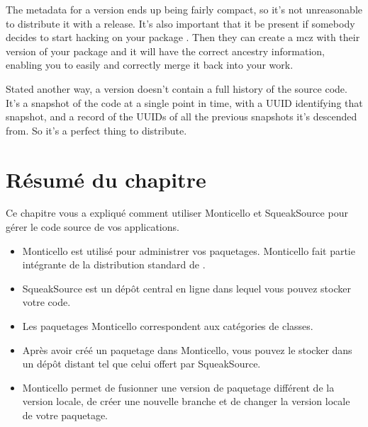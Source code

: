 \documentclass[a4paper,10pt,twoside]{book}
\begin{document}
The metadata for a version ends up being fairly compact, so it's not unreasonable to distribute it with a release.  It's also important that it be present if somebody decides to start hacking on your package . Then they can create a mcz with their version of your package and it will have the correct ancestry information, enabling you to easily and correctly merge it back into your work.

Stated another way, a version doesn't contain a full history of the source code. It's a snapshot of the code at a single point in time, with a UUID identifying that snapshot, and a record of the UUIDs of all the previous snapshots it's descended from. So it's a perfect thing to distribute. 

\section{R\'esum\'e du chapitre}

Ce chapitre vous a expliqu\'e comment utiliser Monticello et
SqueakSource pour g\'erer le code source de vos applications.

\begin{itemize}
\item Monticello est utilis\'e pour administrer vos
  paquetages. Monticello fait partie int\'egrante de la distribution
  standard de \sq.

\item SqueakSource est un d\'ep\^ot central en ligne dans lequel vous
  pouvez stocker votre code.

\item Les paquetages Monticello correspondent aux cat\'egories de classes. 

\item Apr\`es avoir cr\'e\'e un paquetage dans Monticello, vous pouvez
  le  stocker dans un d\'ep\^ot distant tel que celui offert par
  SqueakSource.

\item Monticello permet de fusionner une version de paquetage
  diff\'erent de la version locale, de cr\'eer une nouvelle branche et
  de changer la version locale de votre paquetage.
\end{itemize}
\end{document}
